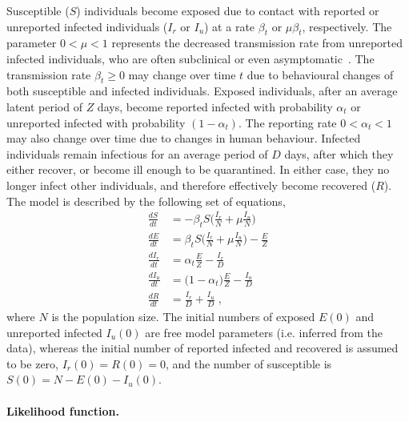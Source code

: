 \documentclass[12pt]{extarticle}
\begin{document}
Susceptible ($S$) individuals become exposed due to contact with reported or unreported infected individuals ($I_r$ or $I_u$) at a rate $\beta_t$ or $\mu \beta_t$, respectively.
The parameter $0 < \mu < 1$ represents the decreased transmission rate from unreported infected individuals, who are often subclinical or even asymptomatic~\citep{Ferretti2020,Thompson2020}.
The transmission rate $\beta_t \ge 0$ may change over  time $t$ due to behavioural changes of both susceptible and infected individuals.
Exposed individuals, after an average latent period of $Z$ days, become reported infected with probability $\alpha_t$ or unreported infected with probability $(1-\alpha_t)$.
The reporting rate $0 < \alpha_t < 1$ may also change over time due to changes in human behaviour.
Infected individuals remain infectious for an average period of $D$ days, after which they either recover, or become ill enough to be quarantined.
In either case, they no longer infect other individuals, and therefore effectively become recovered ($R$).
The model is described by the following set of equations,
\begin{equation} \label{eq:model}
\begin{aligned}
\frac{dS}{dt} & = -\beta_t S \Big(\frac{I_r}{N} + \mu \frac{I_u}{N}\Big) \\
\frac{dE}{dt} & = \beta_t S \Big(\frac{I_r}{N} + \mu \frac{I_u}{N}\Big)  - \frac{E}{Z} \\
\frac{dI_r}{dt} & = \alpha_t \frac{E}{Z} - \frac{I_r}{D} \\
\frac{dI_u}{dt} & = \big(1-\alpha_t\big) \frac{E}{Z} - \frac{I_u}{D} \\
\frac{dR}{dt} & = \frac{I_r}{D} + \frac{I_u}{D} \;,
\end{aligned}
\end{equation}
where $N$ is the population size.
The initial numbers of exposed $E(0)$ and unreported infected $I_u(0)$ are free model parameters (i.e. inferred from the data), whereas the initial number of reported infected and recovered is assumed to be zero, $I_r(0)=R(0)=0$, and the number of susceptible is $S(0)=N-E(0)-I_u(0)$.



\paragraph*{Likelihood function.}
\end{document}

